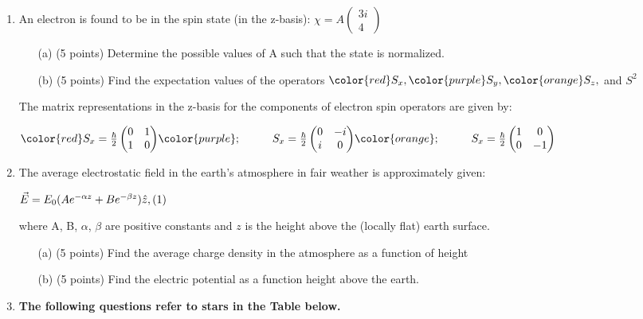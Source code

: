 \documentclass[12pt]{article}
\begin{document}
\begin{enumerate}
\item An electron is found to be in the spin state (in the z-basis): 
$\chi = A  \begin{pmatrix}
3i \\
4
\end{pmatrix}$ 

\begin{itemize}
\item [(a)] (5 points) Determine the possible values of A such that the state is normalized.
\newline
\item [(b)] (5 points) Find the expectation values of the operators ${\color{red}S_x}, {\color{purple}S_y}, {\color{orange}S_z},$
and
$S^2$
\newline
\end{itemize}

The matrix representations in the z-basis for the components of electron spin operators are given by:

$ 
{\color{red} S_x = \frac{\hbar}{2} \begin{pmatrix}
0 & 1 \\
1 & 0 
\end{pmatrix}}
{\color{purple} ;\hspace{1cm} S_x = \frac{\hbar}{2} \begin{pmatrix}
0 & -i \\
i & 0 
\end{pmatrix}}
{\color{orange} ;\hspace{1cm} S_x = \frac{\hbar}{2} \begin{pmatrix}
1 & 0 \\
0 & -1 
\end{pmatrix}}
$

\item The average electrostatic field in the earth’s atmosphere in fair weather is approximately given:


\begin{center}

$
\hfill \vec{E} = E_0 (Ae^{-\alpha z} + Be^{-\beta z}) \hat{z}, \hfill (1)
$
\end{center}

where A, B, $\alpha$, $\beta$ are positive constants and $z$ is the height above the (locally flat) earth surface.
\begin{itemize}
\item [(a)] (5 points) Find the average charge density in the atmosphere as a function of height
\newline
\item [(b)] (5 points) Find the electric potential as a function height above the earth.
\end{itemize}
\item \textbf{The following questions refer to stars in the Table below.} 


\end{enumerate}
\end{document}
